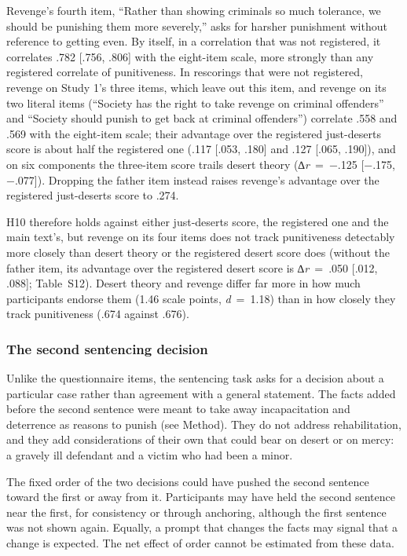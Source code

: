 Revenge's fourth item, ``Rather than showing criminals so much tolerance, we should be punishing them more severely,'' asks for harsher punishment without reference to getting even. By itself, in a correlation that was not registered, it correlates .782 {[}.756, .806{]} with the eight-item scale, more strongly than any registered correlate of punitiveness. In rescorings that were not registered, revenge on Study 1's three items, which leave out this item, and revenge on its two literal items (``Society has the right to take revenge on criminal offenders'' and ``Society should punish to get back at criminal offenders'') correlate .558 and .569 with the eight-item scale; their advantage over the registered just-deserts score is about half the registered one (.117 {[}.053, .180{]} and .127 {[}.065, .190{]}), and on six components the three-item score trails desert theory (∆\emph{r}~=~−.125 {[}−.175, −.077{]}). Dropping the father item instead raises revenge's advantage over the registered just-deserts score to .274.

H10 therefore holds against either just-deserts score, the registered one and the main text's, but revenge on its four items does not track punitiveness detectably more closely than desert theory or the registered desert score does (without the father item, its advantage over the registered desert score is ∆\emph{r}~=~.050 {[}.012, .088{]}; Table~S12). Desert theory and revenge differ far more in how much participants endorse them (1.46 scale points, \emph{d}~=~1.18) than in how closely they track punitiveness (.674 against .676).

\subsubsection{The second sentencing decision}\label{the-second-sentencing-decision}

Unlike the questionnaire items, the sentencing task asks for a decision about a particular case rather than agreement with a general statement. The facts added before the second sentence were meant to take away incapacitation and deterrence as reasons to punish (see Method). They do not address rehabilitation, and they add considerations of their own that could bear on desert or on mercy: a gravely ill defendant and a victim who had been a minor.

The fixed order of the two decisions could have pushed the second sentence toward the first or away from it. Participants may have held the second sentence near the first, for consistency or through anchoring, although the first sentence was not shown again. Equally, a prompt that changes the facts may signal that a change is expected. The net effect of order cannot be estimated from these data.

